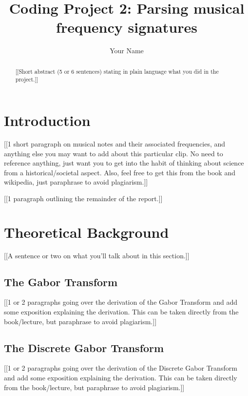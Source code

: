 \documentclass[12pt]{article}%
\begin{document}
\title{Coding Project 2:  Parsing musical frequency signatures}

\author{Your Name}
\date{}

\maketitle


\begin{abstract}
{\color{red} [[Short abstract (5 or 6 sentences) stating in plain language what you did in the project.]]}
\end{abstract}


\section{Introduction}
\label{Sec: Intro}

{\color{red} [[1 short paragraph on musical notes and their associated frequencies, and anything else you may want to add about this particular clip.  No need to reference anything, just want you to get into the habit of thinking about science from a historical/societal aspect.  Also, feel free to get this from the book and wikipedia, just paraphrase to avoid plagiarism.]]}

\bigskip
\bigskip

{\color{red} [[1 paragraph outlining the remainder of the report.]]}


\section{Theoretical Background}

{\color{red}[[A sentence or two on what you'll talk about in this section.]]}


\subsection{The Gabor Transform}

{\color{red}[[1 or 2 paragraphs going over the derivation of the Gabor Transform and add some exposition explaining the derivation.  This can be taken directly from the book/lecture, but paraphrase to avoid plagiarism.]]}


\subsection{The Discrete Gabor Transform}

{\color{red}[[1 or 2 paragraphs going over the derivation of the Discrete Gabor Transform and add some exposition explaining the derivation.  This can be taken directly from the book/lecture, but paraphrase to avoid plagiarism.]]}
\end{document}
